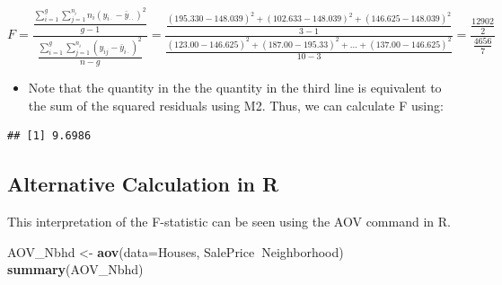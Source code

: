 \documentclass[]{book}
\newenvironment{Shaded}{\begin{snugshade}}{\end{snugshade}}
\newcommand{\KeywordTok}[1]{\textcolor[rgb]{0.13,0.29,0.53}{\textbf{#1}}}
\newcommand{\DataTypeTok}[1]{\textcolor[rgb]{0.13,0.29,0.53}{#1}}
\newcommand{\DecValTok}[1]{\textcolor[rgb]{0.00,0.00,0.81}{#1}}
\newcommand{\FloatTok}[1]{\textcolor[rgb]{0.00,0.00,0.81}{#1}}
\newcommand{\StringTok}[1]{\textcolor[rgb]{0.31,0.60,0.02}{#1}}
\newcommand{\OperatorTok}[1]{\textcolor[rgb]{0.81,0.36,0.00}{\textbf{#1}}}
\newcommand{\NormalTok}[1]{#1}
\providecommand{\tightlist}{%
  \setlength{\itemsep}{0pt}\setlength{\parskip}{0pt}}
\begin{document}
\[
F= \frac{\frac{\displaystyle\sum_{i=1}^g\sum_{j=1}^{n_i}n_i(y_{i\cdot}-\bar{y}_{\cdot\cdot})^2}{g-1}}{\frac{\displaystyle\sum_{i=1}^g\sum_{j=1}^{n_i}(y_{ij}-\bar{y}_{i\cdot})^2}{n-g}} = \frac{\frac{(195.330-148.039)^2+(102.633-148.039)^2+(146.625-148.039)^2}{3-1}}{\frac{(123.00-146.625)^2+ (187.00 - 195.33)^2 + \ldots + (137.00-146.625)^2}{10-3}} = \frac{\frac{12902}{2}}{\frac{4656}{7}}
\]

\begin{itemize}
\tightlist
\item
  Note that the quantity in the the quantity in the third line is
  equivalent to the sum of the squared residuals using M2. Thus, we can
  calculate F using:
\end{itemize}

\begin{Shaded}
\end{Shaded}

\begin{verbatim}
## [1] 9.6986
\end{verbatim}

\subsection{Alternative Calculation in
R}\label{alternative-calculation-in-r}

This interpretation of the F-statistic can be seen using the AOV command
in R.

\begin{Shaded}
\begin{Highlighting}[]
\NormalTok{AOV_Nbhd <-}\StringTok{ }\KeywordTok{aov}\NormalTok{(}\DataTypeTok{data=}\NormalTok{Houses, SalePrice}\OperatorTok{~}\NormalTok{Neighborhood)}
\KeywordTok{summary}\NormalTok{(AOV_Nbhd)}
\end{Highlighting}
\end{Shaded}
\end{document}
